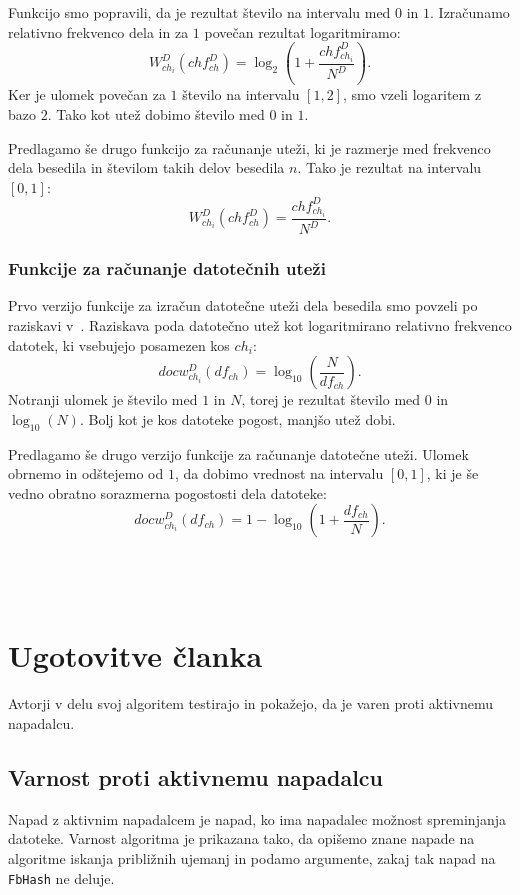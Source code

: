 \documentclass{acm_proc_article-sp}
\begin{document}
Funkcijo smo popravili, da je rezultat število na intervalu med $0$ in $1$. Izračunamo relativno frekvenco dela in za $1$ povečan rezultat logaritmiramo:
\[ W_{ch_i}^{D}(ch f_{ch}^D) = \log_2\left(1 + \frac{ch f_{ch_i}^D}{N^D}\right). \]
Ker je ulomek povečan za $1$ število na intervalu $[1, 2]$, smo vzeli logaritem z bazo $2$. Tako kot utež dobimo število med $0$ in $1$. 

Predlagamo še drugo funkcijo za računanje uteži, ki je razmerje med frekvenco dela besedila in številom takih delov besedila $n$. Tako je rezultat na intervalu $[0,1]$:
\[ W_{ch_i}^{D}(ch f_{ch}^D) = \frac{ch f_{ch_i}^D}{N^D}. \]

\subsubsection{Funkcije za računanje datotečnih uteži}
Prvo verzijo funkcije za izračun datotečne uteži dela besedila smo povzeli po raziskavi v~\cite{fbhash}. Raziskava poda datotečno utež kot logaritmirano relativno frekvenco datotek, ki vsebujejo posamezen kos $ch_i$:
\[ docw_{ch_i}^{D}(df_{ch}) = \log_{10}\left(\frac{N}{df_{ch}}\right). \]
Notranji ulomek je število med $1$ in $N$, torej je rezultat število med $0$ in $\log_{10}(N)$. Bolj kot je kos datoteke pogost, manjšo utež dobi.

Predlagamo še drugo verzijo funkcije za računanje datotečne uteži. Ulomek obrnemo in odštejemo od $1$, da dobimo vrednost na intervalu $[0, 1]$, ki je še vedno obratno sorazmerna pogostosti dela datoteke:
\[ docw_{ch_i}^{D}(df_{ch}) = 1 - \log_{10}\left(1+\frac{df_{ch}}{N}\right).\]
\\\\\\
\section{Ugotovitve \v{c}lanka}

Avtorji v delu svoj algoritem testirajo in pokažejo, da je varen proti aktivnemu napadalcu.

\subsection{Varnost proti aktivnemu napadalcu}

Napad z aktivnim napadalcem je napad, ko ima napadalec možnost spreminjanja datoteke. Varnost algoritma je prikazana tako, da opišemo znane napade na algoritme iskanja približnih ujemanj in podamo argumente, zakaj tak napad na \texttt{FbHash} ne deluje.
\end{document}

